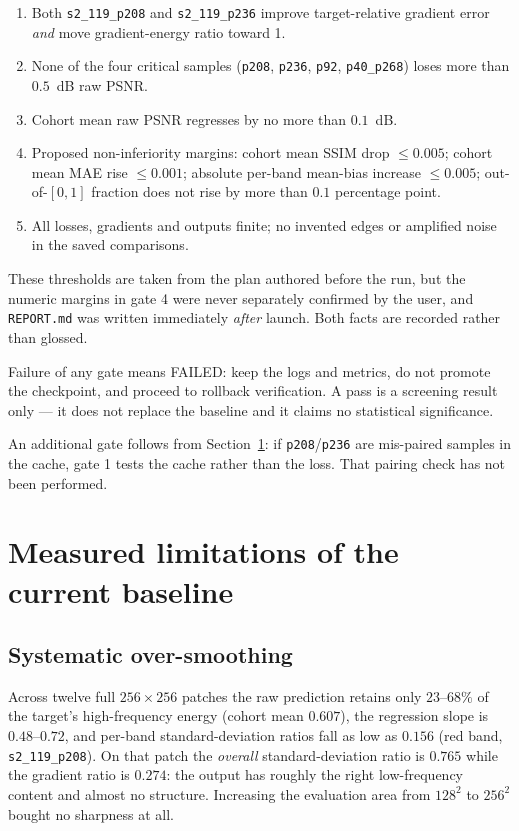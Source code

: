 \documentclass[10pt,a4paper]{article}
\newcommand{\code}[1]{\texttt{#1}}
\begin{document}
\begin{enumerate}
\item Both \code{s2\_119\_p208} and \code{s2\_119\_p236} improve target-relative gradient error
      \emph{and} move gradient-energy ratio toward 1.
\item None of the four critical samples (\code{p208}, \code{p236}, \code{p92}, \code{p40\_p268})
      loses more than $0.5$~dB raw PSNR.
\item Cohort mean raw PSNR regresses by no more than $0.1$~dB.
\item Proposed non-inferiority margins: cohort mean SSIM drop $\le 0.005$; cohort mean MAE rise
      $\le 0.001$; absolute per-band mean-bias increase $\le 0.005$; out-of-$[0,1]$ fraction does
      not rise by more than $0.1$ percentage point.
\item All losses, gradients and outputs finite; no invented edges or amplified noise in the saved
      comparisons.
\end{enumerate}

These thresholds are taken from the plan authored before the run, but the numeric margins in
gate 4 were never separately confirmed by the user, and \code{REPORT.md} was written immediately
\emph{after} launch. Both facts are recorded rather than glossed.

Failure of any gate means FAILED: keep the logs and metrics, do not promote the checkpoint, and
proceed to rollback verification. A pass is a screening result only --- it does not replace the
baseline and it claims no statistical significance.

An additional gate follows from Section~\ref{sec:limits}: if \code{p208}/\code{p236} are
mis-paired samples in the cache, gate 1 tests the cache rather than the loss. That pairing check
has not been performed.

\section{Measured limitations of the current baseline}
\label{sec:limits}

\subsection{Systematic over-smoothing}

Across twelve full $256\times256$ patches the raw prediction retains only
$23$--$68\%$ of the target's high-frequency energy (cohort mean $0.607$), the regression slope is
$0.48$--$0.72$, and per-band standard-deviation ratios fall as low as $0.156$ (red band,
\code{s2\_119\_p208}). On that patch the \emph{overall} standard-deviation ratio is $0.765$ while
the gradient ratio is $0.274$: the output has roughly the right low-frequency content and almost no
structure. Increasing the evaluation area from $128^2$ to $256^2$ bought no sharpness at all.
\end{document}
